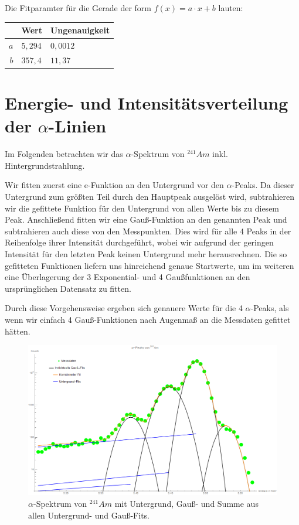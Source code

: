 \documentclass[bigchapter,colorback,accentcolor=tud4b,linedtoc,11pt]{tudreport}
\begin{document}
Die Fitparamter für die Gerade der form $f(x)=a \cdot x + b$ lauten:
\color{blue}
\begin{center}
  \begin{tabular}{r|ll}
        & Wert    & Ungenauigkeit \\ \hline
    $a$ & $5,294$ & $0,0012$      \\ 
    $b$ & $357,4$ & $11,37$       \\ 
  \end{tabular}%
\end{center}
\color{black}



\section{Energie- und Intensitätsverteilung der $\alpha$-Linien}

Im Folgenden betrachten wir das $\alpha$-Spektrum von $^{241}Am$
inkl. Hintergrundstrahlung. 

Wir fitten zuerst eine e-Funktion an den Untergrund vor den $\alpha$-Peaks. Da
dieser Untergrund zum größten Teil durch den Hauptpeak ausgelöst wird,
subtrahieren wir die gefittete Funktion für den Untergrund von allen Werte bis
zu diesem Peak. Anschließend fitten wir eine Gauß-Funktion an den genannten Peak
und subtrahieren auch diese von den Messpunkten. Dies wird für alle 4 Peaks in
der Reihenfolge ihrer Intensität durchgeführt, wobei wir aufgrund der geringen
Intensität für den letzten Peak keinen Untergrund mehr herausrechnen. Die so
gefitteten Funktionen liefern uns hinreichend genaue Startwerte, um im weiteren
eine Überlagerung der 3 Exponential- und 4 Gaußfunktionen an den ursprünglichen
Datensatz zu fitten.

Durch diese Vorgehensweise ergeben sich genauere Werte für die 4 $\alpha$-Peaks,
als wenn wir einfach 4 Gauß-Funktionen nach Augenmaß an die Messdaten gefittet hätten.

\begin{figure}[H] 
  \centering
     \includegraphics[width=1\textwidth]{img/alpha-spektrum.png}
  \caption{$\alpha$-Spektrum von $^{241}Am$ mit Untergrund, Gauß- und
    Summe aus allen Untergrund- und Gauß-Fits.}
  \label{fig:Bild1}
\end{figure}
\end{document}
